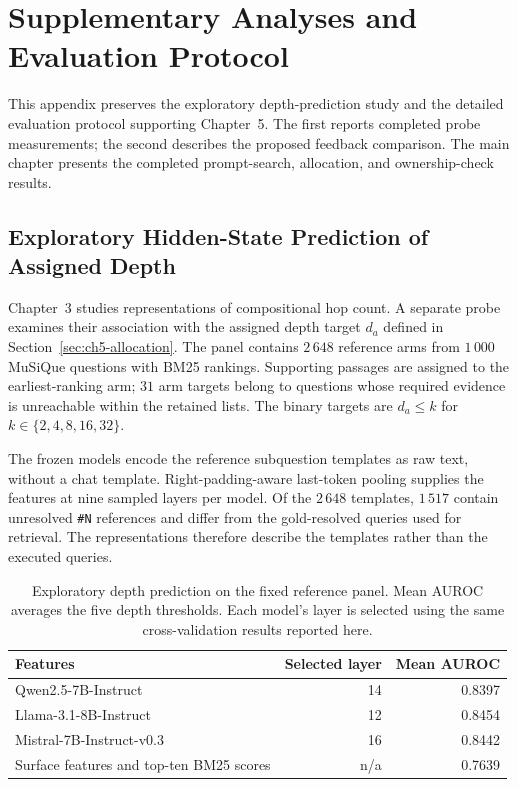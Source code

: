 \chapter[Supplementary Optimisation Studies]{Supplementary Analyses and Evaluation Protocol}
\label{app:optimisation-supplement}

This appendix preserves the exploratory depth-prediction study and the detailed
evaluation protocol supporting Chapter~5. The first reports completed probe
measurements; the second describes the proposed feedback comparison. The main
chapter presents the completed prompt-search, allocation, and ownership-check
results.

\section{Exploratory Hidden-State Prediction of Assigned Depth}
\label{sec:ch5-depth-probe}

Chapter~3 studies representations of compositional hop count. A separate
probe examines their association with the assigned depth target $d_a$
defined in Section~\ref{sec:ch5-allocation}. The panel contains $2\,648$ reference arms from $1\,000$
MuSiQue questions with BM25 rankings. Supporting passages are assigned to
the earliest-ranking arm; $31$ arm targets belong to questions whose
required evidence is unreachable within the retained lists. The binary
targets are $d_a\leq k$ for $k\in\{2,4,8,16,32\}$.

The frozen models encode the reference subquestion templates as raw text,
without a chat template. Right-padding-aware last-token pooling supplies
the features at nine sampled layers per model. Of the $2\,648$ templates,
$1\,517$ contain unresolved \texttt{\#N} references and differ from the
gold-resolved queries used for retrieval. The representations therefore
describe the templates rather than the executed queries.

\begin{table}[H]
\centering
\caption{Exploratory depth prediction on the fixed reference panel.
Mean AUROC averages the five depth thresholds. Each model's layer is
selected using the same cross-validation results reported here.}
\label{tab:ch5-depth-probe}
\begin{tabular}{lrr}
\hline
Features & Selected layer & Mean AUROC \\
\hline
Qwen2.5-7B-Instruct & 14 & 0.8397 \\
Llama-3.1-8B-Instruct & 12 & 0.8454 \\
Mistral-7B-Instruct-v0.3 & 16 & 0.8442 \\
Surface features and top-ten BM25 scores & n/a & 0.7639 \\
\hline
\end{tabular}
\end{table}

